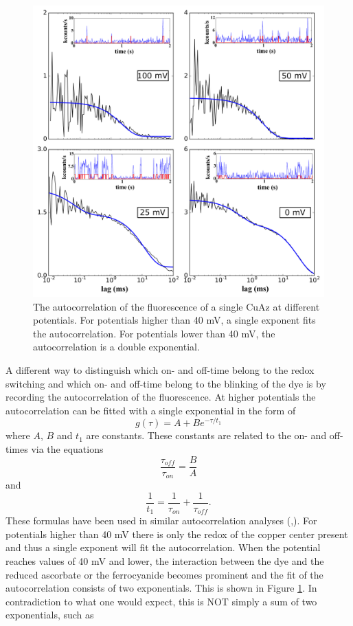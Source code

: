 \documentclass[twoside,single]{lion-msc}
\begin{document}
\begin{figure}[ht!]
\centering
\includegraphics[width=\textwidth]{plots_AC_diff_pot}
\caption{The autocorrelation of the fluorescence of a single CuAz at different potentials. For potentials higher than 40 mV, a single exponent fits the autocorrelation. For potentials lower than 40 mV, the autocorrelation is a double exponential.}
\label{autowcorrelasie}
\end{figure}


A different way to distinguish which on- and off-time belong to the redox switching and which on- and off-time belong to the blinking of the dye is by recording the autocorrelation of the fluorescence. At higher potentials the autocorrelation can be fitted with a single exponential in the form of
\begin{equation} \label{single_exp}
g(\tau) =  A + Be^{-\tau/t_{1}}
\end{equation}
where $A$, $B$ and $t_{1}$ are constants. These constants are related to the on- and off-times via the equations
\begin{equation}\label{tau_on}
\frac{\tau_{off}}{\tau_{on}} = \frac{B}{A}
\end{equation}
and
\begin{equation}\label{tau_off}
\frac{1}{t_{1}} = \frac{1}{\tau_{on}} + \frac{1}{\tau_{off}}.
\end{equation}
These formulas have been used in similar autocorrelation analyses (\cite{Wai-TakYip1998},\cite{Vosch2007}). For potentials higher than 40 mV there is only the redox of the copper center present and thus a single exponent will fit the autocorrelation. When the potential reaches values of 40 mV and lower, the interaction between the dye and the reduced ascorbate or the ferrocyanide becomes prominent and the fit of the autocorrelation consists of two exponentials. This is shown in Figure \ref{autowcorrelasie}. In contradiction to what one would expect, this is NOT simply a sum of two exponentials, such as
\end{document}
